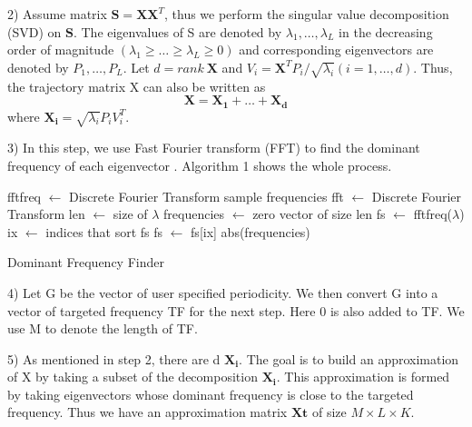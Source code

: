 \documentclass[letterpaper, 10 pt, conference]{ieeeconf}  %
\begin{document}
2) Assume matrix $\mathbf{S}=\mathbf{XX}^T$, thus we perform the singular value decomposition (SVD) on $\mathbf{S}$. The eigenvalues of S are denoted by $\lambda_1, \ldots, \lambda_L$ in the decreasing order of magnitude $(\lambda_1 \geq \ldots \geq \lambda_L \geq 0)$ and corresponding eigenvectors are denoted by $P_1, \ldots, P_L$. Let $d = rank\ \mathbf{X}$ and $V_i = \mathbf{X}^T P_i / \sqrt{\lambda_i} (i = 1, \ldots, d)$. Thus, the trajectory matrix X can also be written as
\begin{equation}
\mathbf{X} = \mathbf{X_1} + \ldots + \mathbf{X_d}
\end{equation}
where $\mathbf{X_i} = \sqrt{\lambda_i} P_i V_i^T$.

3) In this step, we use Fast Fourier transform (FFT) to find the dominant frequency of each eigenvector \cite{cooley1965algorithm} . Algorithm 1 shows the whole process.

\begin{algorithm}[ht]
\DontPrintSemicolon
\SetAlgoLined
\BlankLine

fftfreq $\leftarrow$ Discrete Fourier Transform sample frequencies\;
fft $\leftarrow$ Discrete Fourier Transform\;
len $\leftarrow$ size of $\lambda$\;
frequencies $\leftarrow$ zero vector of size len\;
fs $\leftarrow$ fftfreq($\lambda$)\;
ix $\leftarrow$ indices that sort fs\;
fs $\leftarrow$ fs[ix]\;
\Return abs(frequencies)
\caption{Dominant Frequency Finder}
\end{algorithm}

4) Let G be the vector of user specified periodicity. We then convert G into a vector of targeted frequency TF for the next step. Here 0 is also added to TF. We use M to denote the length of TF.

5) As mentioned in step 2, there are d $\mathbf{X_i}$. The goal is to build an approximation of X by taking a subset of the decomposition $\mathbf{X_i}$. This approximation is formed by taking eigenvectors whose dominant frequency is close to the targeted frequency. Thus we have an approximation matrix $\mathbf{Xt}$ of size $M \times L \times K$.
\end{document}
